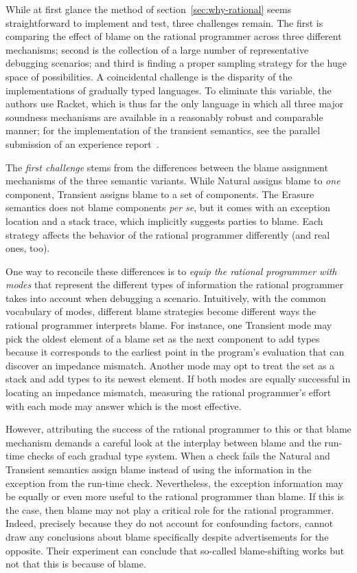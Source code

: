 
While at first glance the method of section~\ref{sec:why-rational} seems straightforward to implement and test,
three challenges remain. The first is comparing the effect of blame on the rational
programmer across three different mechanisms; second is the collection of a large number
of representative debugging scenarios; and third is finding a proper sampling strategy for the
huge space of possibilities. A coincidental challenge is the disparity of the
implementations of gradually typed languages. To eliminate this variable, the
authors use Racket, which is thus far the only language in which all three major
soundness mechanisms are available in a reasonably robust and comparable manner;
for the implementation of the transient semantics, see the parallel submission
of an experience report~\cite{ttt21}.

The {\em first challenge\/} stems from the differences between the blame
assignment mechanisms of the three semantic variants.  While Natural assigns
blame to {\em one\/} component, Transient assigns blame to a set of
components. The Erasure semantics does not blame components {\it per se\/}, but
it comes with an exception location and a stack trace, which implicitly suggests
parties to blame.  Each strategy affects the behavior of the rational programmer
differently (and real ones, too).

One way to reconcile these differences is to {\em equip the rational
programmer with modes \/} that represent the different types of
information the rational programmer takes into account when debugging a
scenario. Intuitively, with the common vocabulary of modes, different
blame strategies become different ways the rational programmer  interprets
blame.  For instance, one Transient mode may pick the oldest element of a
blame set as the next component to add types because it corresponds to the
earliest point in the program's evaluation that can discover an impedance
mismatch.  Another mode may opt to treat the set as a stack and add
types to its newest element.  If both modes are equally successful in
locating an impedance mismatch, measuring the rational programmer's effort with each mode
may answer which is the most effective.


However, attributing the success of the rational programmer to this or
that blame mechanism demands a careful look at the interplay between blame
and the run-time checks of each gradual type system. When a check fails
the Natural and Transient semantics assign blame instead of using the
information in the exception from the run-time check. Nevertheless, the
exception information may be equally or even more useful to the rational
programmer than blame. If this is the case, then blame may not play a critical
role for the rational programmer. Indeed, precisely because they do not
account for confounding factors, \citet{lksfd-popl-2020} cannot draw any
conclusions about blame specifically despite advertisements for the
opposite. Their experiment can conclude that so-called blame-shifting
works but not that this is because of blame. 

